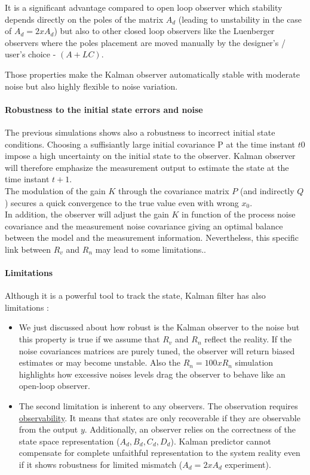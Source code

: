 It is a significant advantage compared to open loop observer which stability depends directly on the poles of the matrix $A_d$ (leading to unstability in the case of $A_d = 2 x A_d$) but also to other closed loop observers like the Luenberger observers where the poles placement
are moved manually by the designer's / user's choice - $(A+LC)$.

Those properties make the Kalman observer automatically stable with moderate noise but also highly flexible to noise variation.

\paragraph{Robustness to the initial state errors and noise}

The previous simulations shows also a robustness to incorrect initial state conditions.  Choosing a suffisiantly large initial covariance P at the time instant $t0$ impose a high uncertainty on the initial state to the observer. Kalman observer will therefore emphasize the measurement output to estimate the state at the time instant $t+1$.\\
The modulation of the gain $K$ through the covariance matrix $P$ (and indirectly $Q$) secures a quick convergence to the true value even with wrong $x_0$.\\
In addition, the observer will adjust the gain $K$ in function of the process noise covariance and the measurement noise covariance giving an optimal balance between the model and the measurement information. Nevertheless, this specific link between $R_v$ and $R_n$ may lead to some 
limitations..

\paragraph{Limitations}

Although it is a powerful tool to track the state, Kalman filter has also limitations :

\begin{itemize}
    \item We just discussed about how robust is the Kalman observer to the noise but this property is true if we assume that $R_v$ and $R_n$ reflect the reality.  If the noise covariances matrices are purely tuned, the observer will return biased estimates or may become unstable.
          Also the $R_n = 100 x R_n$ simulation highlights how excessive noises levels drag the observer to behave like an open-loop observer.
    \item The second limitation is inherent to any observers.  The observation requires \underline{observability}.  It means that states are only recoverable if they are observable from the output $y$. Additionally, an observer relies on the correctness of the state space representation ($A_d, B_d, C_d, D_d$).
          Kalman predictor cannot compensate for complete unfaithful representation to the system reality even if it shows robustness for limited mismatch ($A_d = 2 x A_d$ experiment).
\end{itemize}

